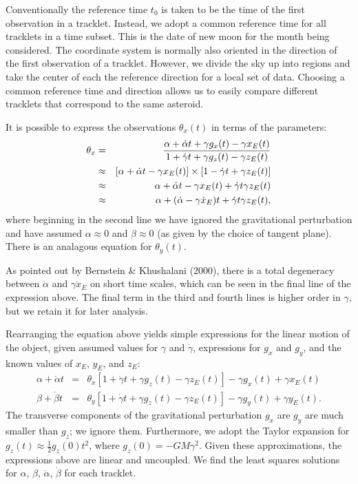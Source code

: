 \documentclass[11pt,letter]{article}
\begin{document}
\begin{enumerate}
Conventionally the reference time $t_0$ is taken to be the time of the first observation in a tracklet.  Instead, we adopt a common reference time for all tracklets in a time subset.  This is the date of new moon for the month being considered.  The coordinate system is normally also oriented in the direction of the first observation of a tracklet.  However, we divide the sky up into regions and take the center of each the reference direction for a local set of data.  Choosing a common reference time and direction allows us to easily compare different tracklets that correspond to the same asteroid.

 It is possible to express the observations $\theta_x(t)$ in terms of the parameters:
\begin{eqnarray}
\label{abgposn}
\theta_x & = & { { \alpha + \dot\alpha t + \gamma g_x(t) - \gamma x_E(t) }
 \over { 1 + \dot\gamma t + \gamma g_z(t) - \gamma z_E(t) } } \\
  & \approx & \left[\alpha + \dot\alpha t - \gamma x_E(t) \right]\times \left[ 1 - \dot\gamma t +\gamma z_E(t)\right] \nonumber\\
  & \approx & \alpha + \dot\alpha t - \gamma x_E(t) + \dot\gamma t\gamma z_E(t) \nonumber\\
 & \approx & \alpha + (\dot\alpha - \gamma \dot{x}_E) t + \dot\gamma t\gamma z_E(t), \nonumber
\end{eqnarray}
where beginning in the second line we have ignored the gravitational perturbation and have assumed $\alpha\approx 0$ and $\beta\approx 0$ (as given by the choice of tangent plane).  There is an analagous equation for $\theta_y(t)$.

As pointed out by Bernstein \& Khushalani (2000), there is a total degeneracy between $\dot\alpha$ and $\gamma\dot{x}_E$ on short time scales, which can be seen in the final line of the expression above.  The final term in the third and fourth lines is higher order in $\gamma$, but we retain it for later analysis.

Rearranging the equation above yields simple expressions for the linear motion of the object, given assumed values for $\gamma$ and $\dot\gamma$, expressions for $g_x$ and $g_y$, and the known values of $x_E$, $y_E$, and $z_E$:
\begin{eqnarray}
\label{rearrange}
{ { \alpha + \dot\alpha t }} &=& \theta_x \left[ 1 + \dot\gamma t + \gamma g_z(t) - \gamma z_E(t)\right] - \gamma g_x(t) + \gamma x_E(t)\\
{ { \beta + \dot\beta t }} &=& \theta_y \left[ 1 + \dot\gamma t + \gamma g_z(t) - \gamma z_E(t)\right] - \gamma g_y(t) + \gamma y_E(t)\nonumber.
\end{eqnarray}
The transverse components of the gravitational perturbation $g_x$ are $g_y$ are much smaller than $g_z$; we ignore them.  Furthermore, we adopt the Taylor expansion for $g_z(t)\approx \frac{1}{2} g_z(0) t^2$, where $g_z(0) = -GM\gamma^2$.  Given these approximations, the expressions above are linear and uncoupled.  We find the least squares solutions for $\alpha$, $\beta$, $\dot\alpha$, $\dot\beta$ for each tracklet.


\end{enumerate}
\end{document}

